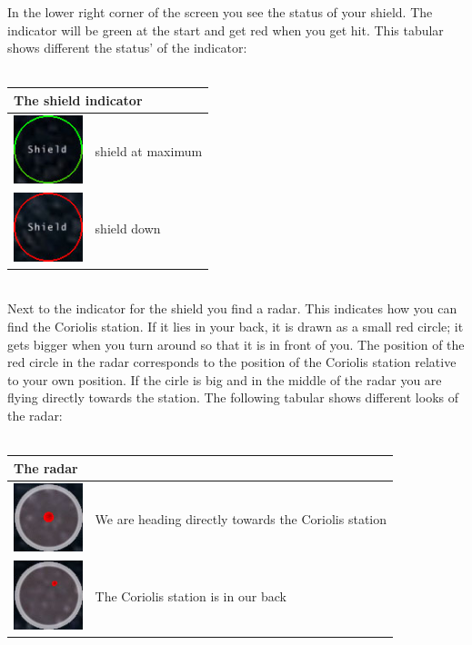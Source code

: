 \documentclass[a4paper,11pt]{article}
\begin{document}
In the lower right corner of the screen you see the status of your shield. The indicator will be green at the start and get red when you get hit. This tabular shows different the status' of the indicator:\\
\ \\
\begin{tabularx}{\textwidth}{|m{2cm}|X|}
	\hline
	  \multicolumn{2}{|l|}{\textbf{The shield indicator\label{shield}}}\\
	\hline
		\includegraphics[width=2cm]{shieldfull.jpg} 								& shield at maximum\\
		\includegraphics[width=2cm]{shielddown.jpg}									& shield down\\
  \hline
\end{tabularx}
\ \\
Next to the indicator for the shield you find a radar. This indicates how you can find the Coriolis station. If it lies in your back, it is drawn as a small red circle; it gets bigger when you turn around so that it is in front of you. The position of the red circle in the radar corresponds to the position of the Coriolis station relative to your own position.
If the cirle is big and in the middle of the radar you are flying directly towards the station.
The following tabular shows different looks of the radar: \\
\ \\
\begin{tabularx}{\textwidth}{|m{2cm}|X|}
	\hline
	  \multicolumn{2}{|l|}{\textbf{The radar\label{radar}}}\\
  \hline
		\includegraphics[width=2cm]{radarcinfront.jpg}							& We are heading directly towards the Coriolis station\\
		\includegraphics[width=2cm]{radarcbehind.jpg} 							& The Coriolis station is in our back\\
	\hline
\end{tabularx}
\end{document}
